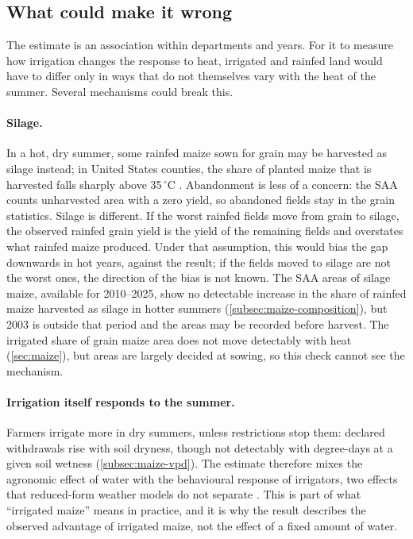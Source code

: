\subsection{What could make it wrong}
\label{subsec:discussion-wrong}

The estimate is an association within departments and years. For it to measure how irrigation changes the response to heat, irrigated and rainfed land would have to differ only in ways that do not themselves vary with the heat of the summer. Several mechanisms could break this.

\paragraph{Silage.} In a hot, dry summer, some rainfed maize sown for grain may be harvested as silage instead; in United States counties, the share of planted maize that is harvested falls sharply above 35\,$^{\circ}$C \parencite{cui2020}. Abandonment is less of a concern: the SAA counts unharvested area with a zero yield, so abandoned fields stay in the grain statistics. Silage is different. If the worst rainfed fields move from grain to silage, the observed rainfed grain yield is the yield of the remaining fields and overstates what rainfed maize produced. Under that assumption, this would bias the gap downwards in hot years, against the result; if the fields moved to silage are not the worst ones, the direction of the bias is not known. The SAA areas of silage maize, available for 2010--2025, show no detectable increase in the share of rainfed maize harvested as silage in hotter summers (\cref{subsec:maize-composition}), but 2003 is outside that period and the areas may be recorded before harvest. The irrigated share of grain maize area does not move detectably with heat (\cref{sec:maize}), but areas are largely decided at sowing, so this check cannot see the mechanism.

\paragraph{Irrigation itself responds to the summer.} Farmers irrigate more in dry summers, unless restrictions stop them: declared withdrawals rise with soil dryness, though not detectably with degree-days at a given soil wetness (\cref{subsec:maize-vpd}). The estimate therefore mixes the agronomic effect of water with the behavioural response of irrigators, two effects that reduced-form weather models do not separate \parencite{bareille2024}. This is part of what ``irrigated maize'' means in practice, and it is why the result describes the observed advantage of irrigated maize, not the effect of a fixed amount of water.


